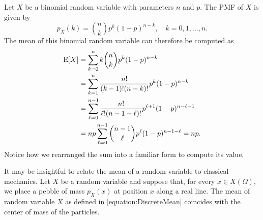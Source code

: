 \begin{example}
Let $X$ be a binomial random variable with parameters $n$ and $p$.
The PMF of $X$ is given by
\begin{equation*}
p_X (k) = \binom{n}{k} p^k (1-p)^{n-k}, \quad k = 0, 1, \ldots, n.
\end{equation*}
The mean of this binomial random variable can therefore be computed as
\begin{equation*}
\begin{split}
\mathrm{E} [X] &= \sum_{k=0}^n k \binom{n}{k} p^k (1-p)^{n-k} \\
&= \sum_{k=1}^n \frac{n!}{(k-1)!(n-k)!} p^k (1-p)^{n-k} \\
&= \sum_{\ell=0}^{n-1} \frac{n!}{\ell!(n-1-\ell)!} p^{\ell+1} (1-p)^{n-\ell-1} \\
&= n p \sum_{\ell=0}^{n-1} \binom{n-1}{\ell} p^{\ell} (1-p)^{n-1-\ell}
= n p .
\end{split}
\end{equation*}
Notice how we rearranged the sum into a familiar form to compute its value.
\end{example}

It may be insightful to relate the mean of a random variable to classical mechanics.
Let $X$ be a random variable and suppose that, for every $x \in X(\Omega)$, we place a pebble of mass $p_X(x)$ at position $x$ along a real line.
The mean of random variable $X$ as defined in \eqref{equation:DiscreteMean} coincides with the center of mass of the particles.

